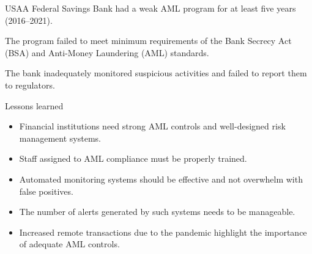 

\begin{checks}
\item USAA Federal Savings Bank had a weak AML program for at least five years
(2016--2021).
\item The program failed to meet minimum requirements of the Bank Secrecy Act
(BSA) and Anti-Money Laundering (AML) standards.
\item The bank inadequately monitored suspicious activities and failed to report
them to regulators.
\end{checks}

\begin{orexambox}{Lessons learned}
\begin{itemize}
\item Financial institutions need strong AML controls and well-designed risk
management systems.
\item Staff assigned to AML compliance must be properly trained.
\item Automated monitoring systems should be effective and not overwhelm with
false positives.
\item The number of alerts generated by such systems needs to be manageable.
\item Increased remote transactions due to the pandemic highlight the importance
of adequate AML controls.
\end{itemize}
\end{orexambox}
